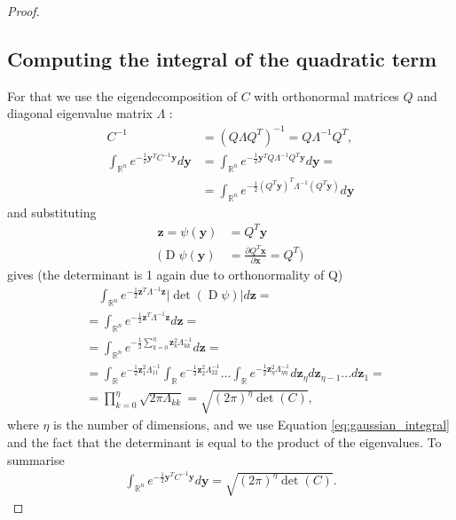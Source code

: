 \documentclass{paper}
\newcommand{\abs}[1]{\left| #1 \right|}
\newcommand{\vr}[1]{\ensuremath{\boldsymbol{#1}}}
\newcommand{\f}[1]{\operatorname{#1}}
\newcommand{\yvec}[0]{\ensuremath{\vr{y}}}
\newcommand{\zvec}[0]{\ensuremath{\vr{z}}}
\begin{document}
\begin{proof}
\subsection*{Computing the integral of the quadratic term}
For that we use the eigendecomposition of $C$ with orthonormal matrices $Q$ and diagonal eigenvalue matrix $\Lambda$ \cite{wiki_eigendecomp}:
\begin{align*}
	C^{-1} &= (Q \Lambda Q^T)^{-1} = Q \Lambda^{-1} Q^T, \nonumber \\
	\int_{\mathbb{R}^n} e^{-\frac{1}{2} \yvec^T C^{-1} \yvec}  d\yvec
	&= \int_{\mathbb{R}^n} e^{-\frac{1}{2} \yvec^T Q \Lambda^{-1} Q^T \yvec}  d\yvec =  \nonumber \\
	&= \int_{\mathbb{R}^n} e^{-\frac{1}{2} (Q^T \yvec)^T \Lambda^{-1} (Q^T \yvec)}  d\yvec
\end{align*}
and substituting
\begin{align*}
\zvec = \psi(\yvec) &= Q^T \yvec \\
\Bigg( \f{D}\psi(\yvec) &= \frac{\partial Q^T \vr{x}}{\partial \vr{x}} = Q^T \Bigg)
\end{align*}
gives (the determinant is 1 again due to orthonormality of Q)
\begin{align*}
	&\quad \int_{\mathbb{R}^n} e^{-\frac{1}{2} \zvec^T \Lambda^{-1} \zvec} \abs{\f{det}(\f{D}\psi)} d\zvec =\\
	&= \int_{\mathbb{R}^n} e^{-\frac{1}{2} \zvec^T \Lambda^{-1} \zvec} d\zvec =\\
	&= \int_{\mathbb{R}^n} e^{-\frac{1}{2} \sum_{k=0}^\eta \zvec_k^2 \Lambda_{kk}^{-1} } d\zvec =\\
	&= \int_{\mathbb{R}} e^{-\frac{1}{2} \zvec_1^2 \Lambda_{11}^{-1} } \int_{\mathbb{R}} e^{-\frac{1}{2} \zvec_2^2 \Lambda_{22}^{-1} } \dots \int_{\mathbb{R}} e^{-\frac{1}{2} \zvec_\eta^2 \Lambda_{\eta\eta}^{-1} } d\zvec_\eta d\zvec_{\eta-1} \dots d\zvec_1 =\\
	&= \prod_{k=0}^\eta \sqrt{2 \pi \Lambda_{kk}} = \sqrt{(2 \pi)^\eta \f{det}(C)},
\end{align*}
where $\eta$ is the number of dimensions, and we use Equation \ref{eq:gaussian_integral} and the fact that the determinant is equal to the product of the eigenvalues. To summarise
\begin{align}
	\int_{\mathbb{R}^n} e^{-\frac{1}{2} \yvec^T C^{-1} \yvec}  d\yvec = \sqrt{(2 \pi)^\eta \f{det}(C)}.
\end{align}


\end{proof}
\end{document}
